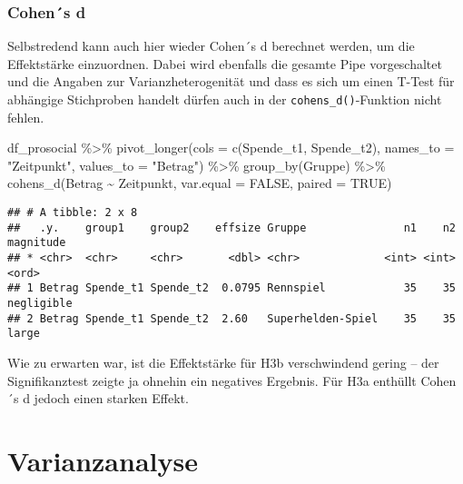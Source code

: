 \documentclass[
]{book}
\newenvironment{Shaded}{\begin{snugshade}}{\end{snugshade}}
\newcommand{\AttributeTok}[1]{\textcolor[rgb]{0.77,0.63,0.00}{#1}}
\newcommand{\ConstantTok}[1]{\textcolor[rgb]{0.00,0.00,0.00}{#1}}
\newcommand{\FunctionTok}[1]{\textcolor[rgb]{0.00,0.00,0.00}{#1}}
\newcommand{\NormalTok}[1]{#1}
\newcommand{\SpecialCharTok}[1]{\textcolor[rgb]{0.00,0.00,0.00}{#1}}
\newcommand{\StringTok}[1]{\textcolor[rgb]{0.31,0.60,0.02}{#1}}
\begin{document}
\hypertarget{cohens-d-2}{%
\subsection{Cohen´s d}\label{cohens-d-2}}

Selbstredend kann auch hier wieder Cohen´s d berechnet werden, um die Effektstärke einzuordnen. Dabei wird ebenfalls die gesamte Pipe vorgeschaltet und die Angaben zur Varianzheterogenität und dass es sich um einen T-Test für abhängige Stichproben handelt dürfen auch in der \texttt{cohens\_d()}-Funktion nicht fehlen.

\begin{Shaded}
\begin{Highlighting}[]
\NormalTok{df\_prosocial }\SpecialCharTok{\%\textgreater{}\%}
      \FunctionTok{pivot\_longer}\NormalTok{(}\AttributeTok{cols =} \FunctionTok{c}\NormalTok{(Spende\_t1, Spende\_t2), }
                   \AttributeTok{names\_to =} \StringTok{"Zeitpunkt"}\NormalTok{, }
                   \AttributeTok{values\_to =} \StringTok{"Betrag"}\NormalTok{) }\SpecialCharTok{\%\textgreater{}\%} 
      \FunctionTok{group\_by}\NormalTok{(Gruppe) }\SpecialCharTok{\%\textgreater{}\%} 
      \FunctionTok{cohens\_d}\NormalTok{(Betrag }\SpecialCharTok{\textasciitilde{}}\NormalTok{ Zeitpunkt, }
             \AttributeTok{var.equal =} \ConstantTok{FALSE}\NormalTok{, }
             \AttributeTok{paired =} \ConstantTok{TRUE}\NormalTok{) }
\end{Highlighting}
\end{Shaded}

\begin{verbatim}
## # A tibble: 2 x 8
##   .y.    group1    group2    effsize Gruppe               n1    n2 magnitude 
## * <chr>  <chr>     <chr>       <dbl> <chr>             <int> <int> <ord>     
## 1 Betrag Spende_t1 Spende_t2  0.0795 Rennspiel            35    35 negligible
## 2 Betrag Spende_t1 Spende_t2  2.60   Superhelden-Spiel    35    35 large
\end{verbatim}

Wie zu erwarten war, ist die Effektstärke für H3b verschwindend gering -- der Signifikanztest zeigte ja ohnehin ein negatives Ergebnis. Für H3a enthüllt Cohen´s d jedoch einen starken Effekt.

\hypertarget{varianzanalyse}{%
\chapter{Varianzanalyse}\label{varianzanalyse}}
\end{document}
